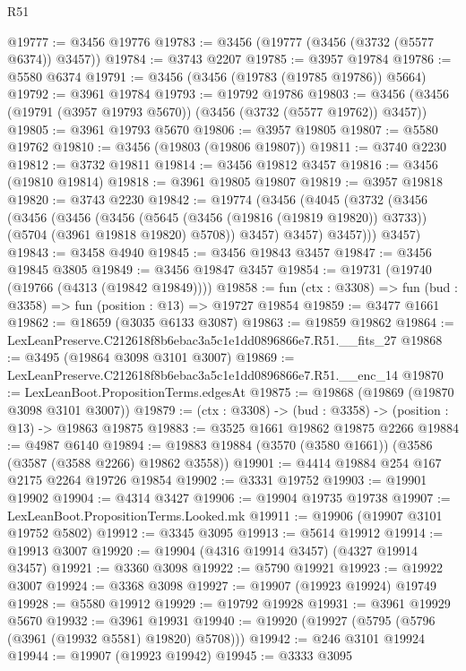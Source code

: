 \begin{lexlean}{R51}
\begin{coremodule}
@19777 := @3456 @19776
@19783 := @3456 (@19777 (@3456 (@3732 (@5577 @6374)) @3457))
@19784 := @3743 @2207
@19785 := @3957 @19784
@19786 := @5580 @6374
@19791 := @3456 (@3456 (@19783 (@19785 @19786)) @5664)
@19792 := @3961 @19784
@19793 := @19792 @19786
@19803 := @3456 (@3456 (@19791 (@3957 @19793 @5670)) (@3456 (@3732 (@5577 @19762)) @3457))
@19805 := @3961 @19793 @5670
@19806 := @3957 @19805
@19807 := @5580 @19762
@19810 := @3456 (@19803 (@19806 @19807))
@19811 := @3740 @2230
@19812 := @3732 @19811
@19814 := @3456 @19812 @3457
@19816 := @3456 (@19810 @19814)
@19818 := @3961 @19805 @19807
@19819 := @3957 @19818
@19820 := @3743 @2230
@19842 := @19774
    (@3456
      (@4045
        (@3732
          (@3456
            (@3456
              (@3456
                (@3456
                  (@5645 (@3456 (@19816 (@19819 @19820)) @3733))
                  (@5704 (@3961 @19818 @19820) @5708))
                @3457)
              @3457)
            @3457)))
      @3457)
@19843 := @3458 @4940
@19845 := @3456 @19843 @3457
@19847 := @3456 @19845 @3805
@19849 := @3456 @19847 @3457
@19854 := @19731 (@19740 (@19766 (@4313 (@19842 @19849))))
@19858 := fun (ctx : @3308) => fun (bud : @3358) => fun (position : @13) => @19727 @19854
@19859 := @3477 @1661
@19862 := @18659 (@3035 @6133 @3087)
@19863 := @19859 @19862
@19864 := LexLeanPreserve.C212618f8b6ebac3a5c1e1dd0896866e7.R51.__fits_27
@19868 := @3495 (@19864 @3098 @3101 @3007)
@19869 := LexLeanPreserve.C212618f8b6ebac3a5c1e1dd0896866e7.R51.__enc_14
@19870 := LexLeanBoot.PropositionTerms.edgesAt
@19875 := @19868 (@19869 (@19870 @3098 @3101 @3007))
@19879 := (ctx : @3308) -> (bud : @3358) -> (position : @13) -> @19863 @19875
@19883 := @3525 @1661 @19862 @19875 @2266
@19884 := @4987 @6140
@19894 := @19883 @19884 (@3570 (@3580 @1661)) (@3586 (@3587 (@3588 @2266) @19862 @3558))
@19901 := @4414 @19884 @254 @167 @2175 @2264 @19726 @19854
@19902 := @3331 @19752
@19903 := @19901 @19902
@19904 := @4314 @3427
@19906 := @19904 @19735 @19738
@19907 := LexLeanBoot.PropositionTerms.Looked.mk
@19911 := @19906 (@19907 @3101 @19752 @5802)
@19912 := @3345 @3095
@19913 := @5614 @19912
@19914 := @19913 @3007
@19920 := @19904 (@4316 @19914 @3457) (@4327 @19914 @3457)
@19921 := @3360 @3098
@19922 := @5790 @19921
@19923 := @19922 @3007
@19924 := @3368 @3098
@19927 := @19907 (@19923 @19924) @19749
@19928 := @5580 @19912
@19929 := @19792 @19928
@19931 := @3961 @19929 @5670
@19932 := @3961 @19931
@19940 := @19920 (@19927 (@5795 (@5796 (@3961 (@19932 @5581) @19820) @5708)))
@19942 := @246 @3101 @19924
@19944 := @19907 (@19923 @19942)
@19945 := @3333 @3095

\end{coremodule}
\end{lexlean}
